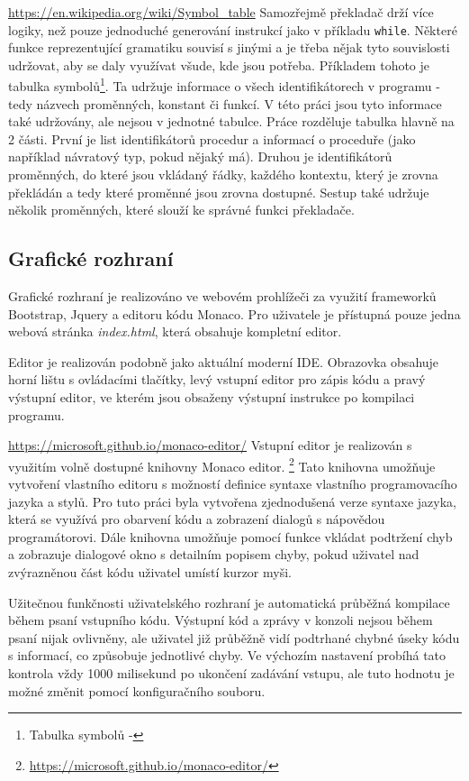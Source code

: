 \documentclass[12pt, letterpaper]{article}
\begin{document}
%
\urldef{\urlC}\url{https://en.wikipedia.org/wiki/Symbol_table}
Samozřejmě překladač drží více logiky, než pouze jednoduché generování instrukcí jako v příkladu \texttt{while}. Některé
funkce reprezentující gramatiku souvisí s jinými a je třeba nějak tyto souvislosti udržovat, aby se daly využívat všude,
kde jsou potřeba. Příkladem tohoto je tabulka symbolů\footnote{Tabulka symbolů - \urlC}. Ta udržuje informace o všech identifikátorech v
programu - tedy názvech proměnných, konstant či funkcí. V této práci jsou tyto informace také udržovány, ale nejsou v
jednotné tabulce. Práce rozděluje tabulka hlavně na 2 části. První je list identifikátorů procedur a informací o 
proceduře (jako například návratový typ, pokud nějaký má). Druhou je  identifikátorů proměnných, do které jsou
vkládaný řádky, každého kontextu, který je zrovna překládán a tedy které proměnné jsou zrovna dostupné. Sestup také 
udržuje několik  proměnných, které slouží ke správné funkci překladače.
%
\subsection{Grafické rozhraní}
Grafické rozhraní je realizováno ve webovém prohlížeči za využití frameworků Bootstrap, Jquery a editoru kódu Monaco. Pro uživatele je přístupná pouze jedna webová stránka \textit{index.html}, která obsahuje kompletní editor. 

Editor je realizován podobně jako aktuální moderní IDE. Obrazovka obsahuje horní lištu s ovládacími tlačítky, levý vstupní editor pro zápis kódu a pravý výstupní editor, ve kterém jsou obsaženy výstupní instrukce po kompilaci programu.

\urldef{\urlD}\url{https://microsoft.github.io/monaco-editor/}
Vstupní editor je realizován s využitím volně dostupné knihovny Monaco editor. \footnote{\url{https://microsoft.github.io/monaco-editor/}} Tato knihovna umožňuje vytvoření vlastního editoru s možností definice syntaxe vlastního programovacího jazyka a stylů. Pro tuto práci byla vytvořena zjednodušená verze syntaxe jazyka, která se využívá pro obarvení kódu a zobrazení dialogů s nápovědou programátorovi. Dále knihovna umožňuje pomocí funkce vkládat podtržení chyb a zobrazuje dialogové okno s detailním popisem chyby, pokud uživatel nad zvýrazněnou část kódu uživatel umístí kurzor myši.


Užitečnou funkčnosti uživatelského rozhraní je automatická průběžná kompilace během psaní vstupního kódu. Výstupní kód a zprávy v konzoli nejsou během psaní nijak ovlivněny, ale uživatel již průběžně vidí podtrhané chybné úseky kódu s informací, co způsobuje jednotlivé chyby. Ve výchozím nastavení probíhá tato kontrola vždy 1000 milisekund po ukončení zadávání vstupu, ale tuto hodnotu je možné změnit pomocí konfiguračního souboru.
\end{document}
